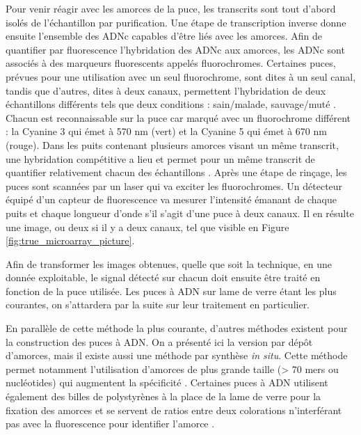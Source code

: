 Pour venir réagir avec les amorces de la puce, les transcrits sont tout d'abord isolés de l'échantillon par purification. Une étape de transcription inverse donne ensuite l'ensemble des ADNc capables d'être liés avec les amorces. Afin de quantifier par fluorescence l'hybridation des ADNc aux amorces, les ADNc sont associés à des marqueurs fluorescents appelés fluorochromes. Certaines puces, prévues pour une utilisation avec un seul fluorochrome, sont dites à un seul canal, tandis que d'autres, dites à deux canaux, permettent l'hybridation de deux échantillons différents tels que deux conditions : sain/malade, sauvage/muté \cite{Bumgarner2013Jan}. Chacun est reconnaissable sur la puce car marqué avec un fluorochrome différent : la Cyanine 3 qui émet à  570 nm (vert) et la Cyanine 5 qui émet à 670 nm (rouge). Dans les puits contenant plusieurs amorces visant un même transcrit, une hybridation compétitive a lieu et permet pour un même transcrit de quantifier relativement chacun des échantillons \cite{Koltai2008Apr}. Après une étape de rinçage, les puces sont scannées par un laser qui va exciter les fluorochromes. Un détecteur équipé d'un capteur de fluorescence va mesurer l'intensité émanant de chaque puits et chaque longueur d'onde s'il s'agit d'une puce à deux canaux. Il en résulte une image, ou deux si il y a deux canaux, tel que visible en Figure \ref{fig:true_microarray_picture}.



Afin de transformer les images obtenues, quelle que soit la technique, en une donnée exploitable, le signal détecté sur chacun doit ensuite être traité en fonction de la puce utilisée. Les puces à ADN sur lame de verre étant les plus courantes, on s'attardera par la suite sur leur traitement en particulier.

En parallèle de cette méthode la plus courante, d'autres méthodes existent pour la construction des puces à ADN. On a présenté ici la version par dépôt d'amorces, mais il existe aussi une méthode par synthèse \textit{in situ}. Cette méthode permet notamment l'utilisation d'amorces de plus grande taille (> 70 mers ou nucléotides) qui augmentent la spécificité \cite{Liu2010}. Certaines puces à ADN utilisent également des billes de polystyrènes à la place de la lame de verre pour la fixation des amorces et se servent de ratios entre deux colorations n'interférant pas avec la fluorescence pour identifier l'amorce \cite{Nesterov-Mueller2014Oct}. 


